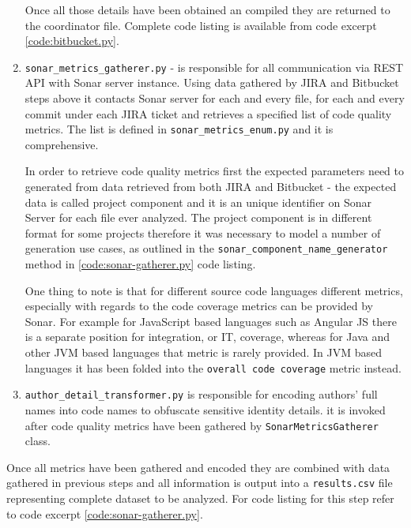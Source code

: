 \begin{enumerate}
    Once all those details have been obtained an compiled they are returned to the coordinator file.
    Complete code listing is available from code excerpt \ref{code:bitbucket.py}.
    
    \item\label{lst:impl.item:sonar-metrics-gatherer} \texttt{sonar\_metrics\_gatherer.py} - is responsible for all communication via REST API with Sonar server instance. Using data gathered by JIRA and Bitbucket steps above it contacts Sonar server for each and every file, for each and every commit under each JIRA ticket and retrieves a specified list of code quality metrics. The list is defined in \texttt{sonar\_metrics\_enum.py} and it is comprehensive. 
    
    In order to retrieve code quality metrics first the expected parameters need to generated from data retrieved from both JIRA and Bitbucket - the expected data is called project component  and it is an unique identifier on Sonar Server for each file ever analyzed. The project component is in different format for some projects therefore it was necessary to model a number of generation use cases, as outlined in the \texttt{sonar\_component\_name\_generator} method in \ref{code:sonar-gatherer.py} code listing.
    
    One thing to note is that for different source code languages different metrics, especially with regards to the code coverage metrics can be provided by Sonar. For example for JavaScript based languages such as Angular JS there is a separate position for integration, or IT, coverage, whereas for Java and other JVM based languages that metric is rarely provided. In JVM based languages it has been folded into the \texttt{overall code coverage} metric instead.
    
    \item\label{lst:impl.item:author-encoder} \texttt{author\_detail\_transformer.py} is responsible for encoding authors' full names into code names to obfuscate sensitive identity details. it is invoked after code quality metrics have been gathered by \texttt{SonarMetricsGatherer} class.
    
\end{enumerate}
Once all metrics have been gathered and encoded they are combined with data gathered in previous steps and all information is output into a \texttt{results.csv} file representing complete dataset to be analyzed. For code listing for this step refer to code excerpt \ref{code:sonar-gatherer.py}.

